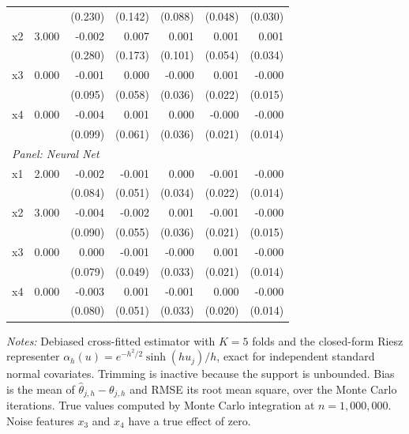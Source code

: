 \documentclass[12pt,a4paper]{article}
\numberwithin{equation}{section}
\theoremstyle{plain}
\theoremstyle{definition}
\begin{document}
\begin{table}[htbp]
\begin{threeparttable}
\begin{tabular}{lrrrrrr}
				&  & (0.230) & (0.142) & (0.088) & (0.048) & (0.030) \\
				\quad x2 & 3.000 & -0.002 & 0.007 & 0.001 & 0.001 & 0.001 \\
				&  & (0.280) & (0.173) & (0.101) & (0.054) & (0.034) \\
				\quad x3 & 0.000 & -0.001 & 0.000 & -0.000 & 0.001 & -0.000 \\
				&  & (0.095) & (0.058) & (0.036) & (0.022) & (0.015) \\
				\quad x4 & 0.000 & -0.004 & 0.001 & 0.000 & -0.000 & -0.000 \\
				&  & (0.099) & (0.061) & (0.036) & (0.021) & (0.014) \\
				\midrule
				\multicolumn{7}{l}{\textit{Panel: Neural Net}} \\
				\quad x1 & 2.000 & -0.002 & -0.001 & 0.000 & -0.001 & -0.000 \\
				&  & (0.084) & (0.051) & (0.034) & (0.022) & (0.014) \\
				\quad x2 & 3.000 & -0.004 & -0.002 & 0.001 & -0.001 & -0.000 \\
				&  & (0.090) & (0.055) & (0.036) & (0.021) & (0.015) \\
				\quad x3 & 0.000 & 0.000 & -0.001 & -0.000 & 0.001 & -0.000 \\
				&  & (0.079) & (0.049) & (0.033) & (0.021) & (0.014) \\
				\quad x4 & 0.000 & -0.003 & 0.001 & -0.001 & 0.000 & -0.000 \\
				&  & (0.080) & (0.051) & (0.033) & (0.020) & (0.014) \\
				\bottomrule
				\end{tabular}
				\begin{tablenotes}
				\footnotesize
				\item \textit{Notes:} Debiased cross-fitted estimator with $K=5$ folds and the closed-form Riesz representer $\alpha_h(u) = e^{-h^2/2}\sinh(h u_j)/h$, exact for independent standard normal covariates. Trimming is inactive because the support is unbounded. Bias is the mean of $\hat{\theta}_{j,h} - \theta_{j,h}$ and RMSE its root mean square, over the Monte Carlo iterations. True values computed by Monte Carlo integration at $n=1{,}000{,}000$. Noise features $x_3$ and $x_4$ have a true effect of zero.
				\end{tablenotes}
		\end{threeparttable}
	\end{table}
	
\end{document}
